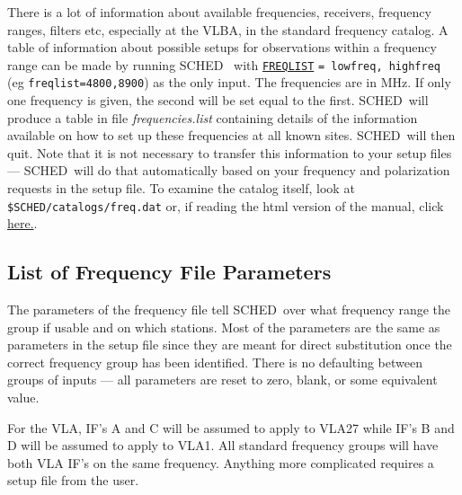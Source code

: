 \documentclass{report}
\newcommand{\schedb}{{\sc SCHED~}}
\begin{document}
There is a lot of information about available frequencies, receivers,
frequency ranges, filters etc, especially at the VLBA, in the standard
frequency catalog.  A table of information about possible setups for
observations within a frequency range can be made by running \schedb
with 
{\hyperref[MP:FREQLIST]{{\tt FREQLIST}}} {\tt = lowfreq, highfreq}
(eg {\tt freqlist=4800,8900}) as the only input.  The frequencies are
in MHz.  If only one frequency is given, the second will be set equal
to the first.  \schedb will produce a table in file {\sl
frequencies.list} containing details of the information available on
how to set up these frequencies at all known sites.  \schedb will then
quit.  Note that it is not necessary to transfer this information to
your setup files --- \schedb will do that automatically based on your
frequency and polarization requests in the setup file.  To examine the
catalog itself, look at {\tt \$SCHED/catalogs/freq.dat} or, if reading
the html version of the manual, click 
{\href{catalogs/freq.dat}{here.}}.


\subsection{\label{SSEC:FREQLST}List of Frequency File Parameters}

The parameters of the frequency file tell \schedb over what frequency
range the group if usable and on which stations.  Most of the parameters
are the same as parameters in the setup file since they are meant
for direct substitution once the correct frequency group has been
identified.  There is no defaulting between groups of inputs --- all
parameters are reset to zero, blank, or some equivalent value.

For the VLA, IF's A and C will be assumed to apply to VLA27 while
IF's B and D will be assumed to apply to VLA1.  All standard
frequency groups will have both VLA IF's on the same frequency.
Anything more complicated requires a setup file from the user.
\end{document}
